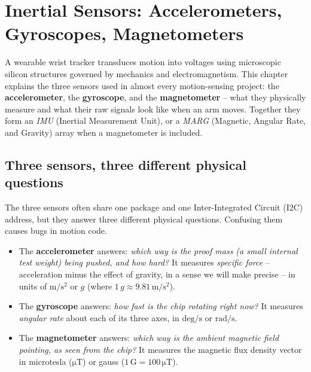 \chapter{Inertial Sensors: Accelerometers, Gyroscopes, Magnetometers}

A wearable wrist tracker transduces motion into voltages using microscopic silicon structures governed by mechanics and electromagnetism. This chapter explains the three sensors used in almost every motion-sensing project: the \textbf{accelerometer}, the \textbf{gyroscope}, and the \textbf{magnetometer} -- what they physically measure and what their raw signals look like when an arm moves. Together they form an \emph{IMU} (Inertial Measurement Unit), or a \emph{MARG} (Magnetic, Angular Rate, and Gravity) array when a magnetometer is included.

\section{Three sensors, three different physical questions}
\label{ch34:three-questions}

The three sensors often share one package and one Inter-Integrated Circuit (I2C) address, but they answer three different physical questions. Confusing them causes bugs in motion code.

\begin{itemize}
\item The \textbf{accelerometer} answers: \emph{which way is the proof mass (a small internal test weight) being
  pushed, and how hard?} It measures \emph{specific force} -- acceleration minus the
  effect of gravity, in a sense we will make precise -- in units of $\mathrm{m/s^2}$
  or $g$ (where $1\,g \approx 9.81\,\mathrm{m/s^2}$).
\item The \textbf{gyroscope} answers: \emph{how fast is the chip rotating right now?}
  It measures \emph{angular rate} about each of its three axes, in $\mathrm{deg/s}$ or
  $\mathrm{rad/s}$.
\item The \textbf{magnetometer} answers: \emph{which way is the ambient magnetic field
  pointing, as seen from the chip?} It measures the magnetic flux density vector in
  microtesla ($\mathrm{\mu T}$) or gauss ($1\,\mathrm{G}=100\,\mathrm{\mu T}$).
\end{itemize}

